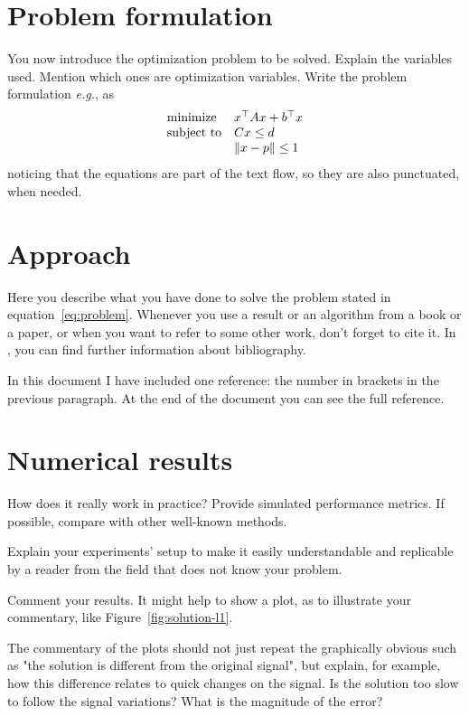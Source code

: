 \documentclass[a4paper]{IEEEtran}
\begin{document}
\section{Problem formulation}
\label{sec:problem-formulation}

You now introduce the optimization problem to be solved. Explain the
variables used. Mention which ones are optimization variables. Write
the problem formulation \textit{e.g.}, as
\begin{equation}
  \label{eq:problem}
\begin{array}[t]{ll} \text{minimize} & x^\top A x + b^\top x \\
\text{subject to} & C x \leq d \\ & \left\| x - p \right\| \leq 1 \end{array}
\end{equation}
noticing that the equations are part of the text flow, so they are also
punctuated, when needed.

\section{Approach}
\label{sec:approach}

Here you describe what you have done to solve the problem stated in
equation~\eqref{eq:problem}. Whenever you use a result or an algorithm
from a book or a paper, or when you want to refer to some other work,
don't forget to cite it. In \cite{Oetiker11}, you can find further
information about bibliography.

In this document I have included one reference: the number in brackets
in the previous paragraph. At the end of the document you can see the
full reference.

\section{Numerical results}
\label{sec:numerical-results}

How does it really work in practice? Provide simulated performance
metrics. If possible, compare with other well-known methods.

Explain your experiments' setup to make it easily understandable and
replicable by a reader from the field that does not know your problem.

Comment your results. It might help to show a plot, as to illustrate
your commentary, like Figure~\ref{fig:solution-l1}.


The commentary of the plots should not just repeat the graphically
obvious such as "the solution is different from the original signal",
but explain, for example, how this difference relates to quick changes
on the signal. Is the solution too slow to follow the signal
variations? What is the magnitude of the error?
\end{document}

